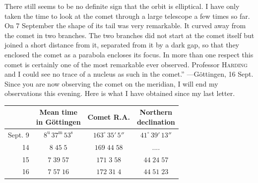 \par\indent There still seems to be no definite sign that the orbit is elliptical. I have only taken the time to look at the comet through a large telescope a few times so far. On 7 September the shape of its tail was very remarkable. It curved away from the comet in two branches. The two branches did not start at the comet itself but joined a short distance from it, separated from it by a dark gap, so that they enclosed the comet as a parabola encloses its focus. In more than one respect this comet is certainly one of the most remarkable ever observed. Professor \textsc{Harding} and I could see no trace of a nucleus as such in the comet.” ---\quad Göttingen, 16 Sept. Since you are now observing the comet on the meridian, I will end my observations this evening. Here is what I have obtained since my last letter.
\begin{center}\fontsize{10}{12}\selectfont\setlength{\tabcolsep}{4pt}\renewcommand{\arraystretch}{1.15}\begin{tabular}{r|c|c|c}
 & \shortstack{Mean time\\in Göttingen} & Comet R.A. & \shortstack{Northern\\declination}\\\hline
Sept. 9 & $8^{\mathrm u}\,37^{\mathrm m}\,53^{\mathrm s}$ & $163^\circ\,35'\,5''$ & $41^\circ\,39'\,13''$\\
14 & $8\;45\;5$ & $169\;44\;58$ & .\quad.\quad.\quad.\\
15 & $7\;39\;57$ & $171\;3\;58$ & $44\;24\;57$\\
16 & $7\;57\;16$ & $172\;31\;4$ & $44\;51\;23$\\
\end{tabular}\end{center}

